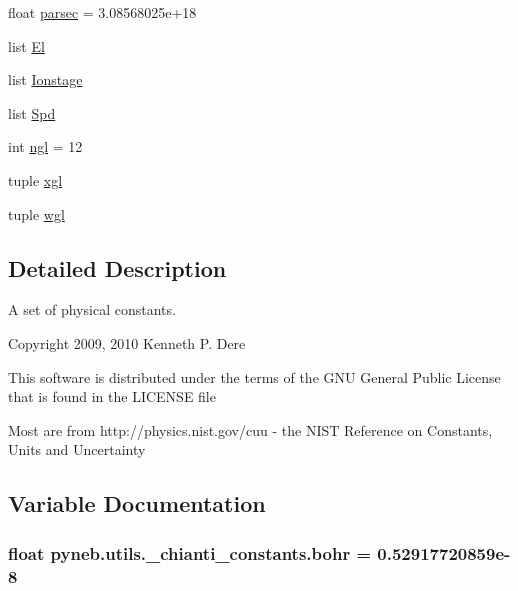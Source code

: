 \begin{DoxyCompactItemize}
$$float \hyperlink{namespacepyneb_1_1utils_1_1__chianti__constants_abcf6354e4070185098bde01f7ce5c8aa}{parsec} = 3.\-08568025e+18
\item 
list \hyperlink{namespacepyneb_1_1utils_1_1__chianti__constants_ab3931b9eb84335e5e2051b39a17271ad}{El}
\item 
list \hyperlink{namespacepyneb_1_1utils_1_1__chianti__constants_a21256617e8a01b45a8d911c01fd8f6fa}{Ionstage}
\item 
list \hyperlink{namespacepyneb_1_1utils_1_1__chianti__constants_a747bb75e4249625a2aefd7060478096f}{Spd}
\item 
int \hyperlink{namespacepyneb_1_1utils_1_1__chianti__constants_aa56aafac98ada2bbf340753caef7378f}{ngl} = 12
\item 
tuple \hyperlink{namespacepyneb_1_1utils_1_1__chianti__constants_af1590059269ec4a1186c9746d22d1201}{xgl}
\item 
tuple \hyperlink{namespacepyneb_1_1utils_1_1__chianti__constants_a46ae7f1b894a2436d928f1280232b724}{wgl}
\end{DoxyCompactItemize}


\subsection{Detailed Description}
\begin{DoxyVerb}A set of physical constants.

Copyright 2009, 2010 Kenneth P. Dere

This software is distributed under the terms of the GNU General Public License
that is found in the LICENSE file


Most are from http://physics.nist.gov/cuu - the NIST Reference on
Constants, Units and Uncertainty\end{DoxyVerb}
 

\subsection{Variable Documentation}
\hypertarget{namespacepyneb_1_1utils_1_1__chianti__constants_a46e1240195152585367ef49738a8af20}{
\subsubsection[{bohr}]{\setlength{\rightskip}{0pt plus 5cm}float pyneb.\-utils.\-\_\-chianti\-\_\-constants.\-bohr = 0.\-52917720859e-\/8}}\label{namespacepyneb_1_1utils_1_1__chianti__constants_a46e1240195152585367ef49738a8af20}


